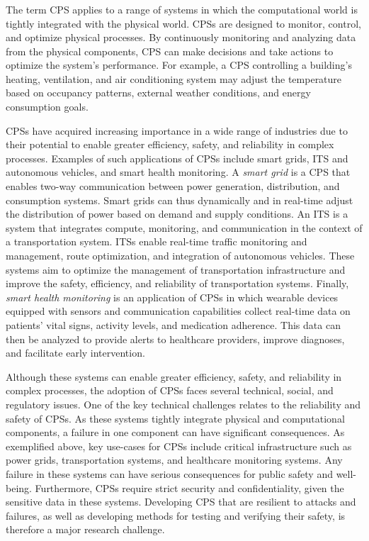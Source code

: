 \subsubsection{}

The term \gls{CPS} applies to a range of systems in which the computational world is tightly integrated with the physical world.
\glspl{CPS} are designed to monitor, control, and optimize physical processes.
By continuously monitoring and analyzing data from the physical components, \gls{CPS} can make decisions and take actions to optimize the system's performance.
For example, a \gls{CPS} controlling a building's heating, ventilation, and air conditioning system may adjust the temperature based on occupancy patterns, external weather conditions, and energy consumption goals.

\glspl{CPS} have acquired increasing importance in a wide range of industries due to their potential to enable greater efficiency, safety, and reliability in complex processes.
Examples of such applications of \glspl{CPS} include smart grids, \acs{ITS} and autonomous vehicles, and smart health monitoring.
A \emph{smart grid} is a \gls{CPS} that enables two-way communication between power generation, distribution, and consumption systems.
Smart grids can thus dynamically and in real-time adjust the distribution of power based on demand and supply conditions.
 An \gls{ITS} is a system that integrates compute, monitoring, and communication in the context of a transportation system.
\glspl{ITS} enable real-time traffic monitoring and management, route optimization, and integration of autonomous vehicles.
These systems aim to optimize the management of transportation infrastructure and improve the safety, efficiency, and reliability of transportation systems.
Finally, \emph{smart health monitoring} is an application of \glspl{CPS} in which wearable devices equipped with sensors and communication capabilities collect real-time data on patients' vital signs, activity levels, and medication adherence.
This data can then be analyzed to provide alerts to healthcare providers, improve diagnoses, and facilitate early intervention.

Although these systems can enable greater efficiency, safety, and reliability in complex processes, the adoption of \glspl{CPS} faces several technical, social, and regulatory issues.
One of the key technical challenges relates to the reliability and safety of \glspl{CPS}.
As these systems tightly integrate physical and computational components, a failure in one component can have significant consequences.
As exemplified above, key use-cases for \glspl{CPS} include critical infrastructure such as power grids, transportation systems, and healthcare monitoring systems.
Any failure in these systems can have serious consequences for public safety and well-being.
Furthermore, \glspl{CPS} require strict security and confidentiality, given the sensitive data in these systems.
Developing CPS that are resilient to attacks and failures, as well as developing methods for testing and verifying their safety, is therefore a major research challenge.


